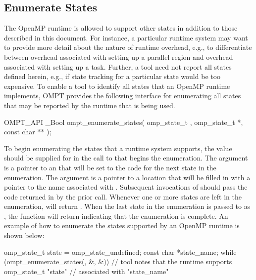 \documentclass{article}
\begin{document}
 \subsection{Enumerate States}
 \label{ompt_enumerate_states}
 
 The OpenMP runtime is allowed to support other states in addition to those described in this document.
For instance, a particular runtime system may want to 
provide more detail about the nature of runtime overhead, 
e.g., to differentiate between  overhead associated with setting up a parallel region
and  overhead associated with setting up a task. Further, a tool need not report all states defined herein, e.g., if state tracking for a particular state would be too expensive.
To enable a tool to identify all states that an OpenMP runtime implements, OMPT provides
the following interface for enumerating all states that may be reported by the runtime that is being used.

\begin{boxedcode}
OMPT\_API \_Bool ompt\_enumerate\_states(
  omp\_state\_t , 
  omp\_state\_t *, 
  const char **
);
\end{boxedcode}

\noindent
To begin enumerating the states that a runtime system supports,
the value  should be supplied for  in the call to  that begins the enumeration.
The argument  is a pointer to an  that will be set to the code for the next state in the enumeration.
The argument  is a pointer to a location that will be filled in with a pointer to the name associated with . 
Subsequent invocations of  should pass the code returned in  by the prior call.
Whenever one or more states are left in the enumeration,  will return .
When the last state in the enumeration is passed to  as , the function will return  indicating that the enumeration is complete.
An example of how to enumerate the states supported by an OpenMP runtime is shown below:

\begin{boxedcode}
omp\_state\_t state = omp\_state\_undefined;
const char *state\_name;
while (ompt\_enumerate\_states(, &, &)) {
  // tool notes that the runtime supports omp\_state\_t "state" 
  // associated with "state\_name" 
}
\end{boxedcode}
\end{document}
